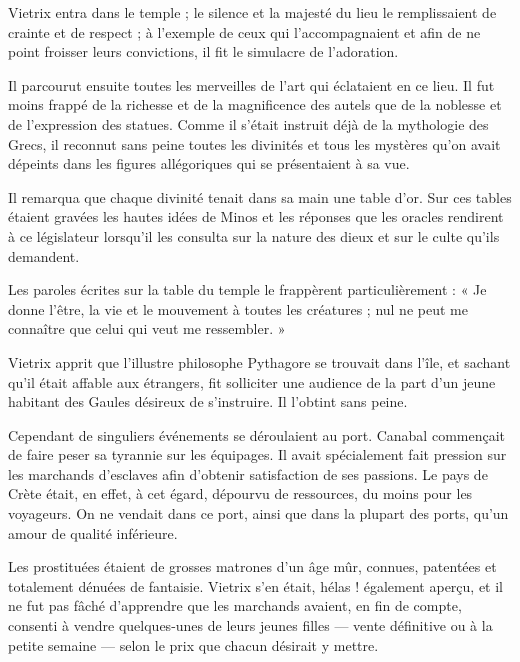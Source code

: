 \documentclass[a4paper, 11pt, oneside, polutonikogreek, french]{article}
\begin{document}
Vietrix entra dans le temple ; le silence et la majesté du lieu le remplissaient de crainte et de respect ; à l'exemple de ceux qui l'accompagnaient et afin de ne point froisser leurs convictions, il fit le simulacre de l'adoration.

Il parcourut ensuite toutes les merveilles de l'art qui éclataient en ce lieu. Il fut moins frappé de la richesse et de la magnificence des autels que de la noblesse et de l'expression des statues. Comme il s'était instruit déjà de la mythologie des Grecs, il reconnut sans peine toutes les divinités et tous les mystères qu'on avait dépeints dans les figures allégoriques qui se présentaient à sa vue.

Il remarqua que chaque divinité tenait dans sa main une table d'or. Sur ces tables étaient gravées les hautes idées de Minos et les réponses que les oracles rendirent à ce législateur lorsqu'il les consulta sur la nature des dieux et sur le culte qu'ils demandent.

Les paroles écrites sur la table du temple le frappèrent particulièrement : « Je donne l'être, la vie et le mouvement à toutes les créatures ; nul ne peut me connaître que celui qui veut me ressembler. »

\bigskip
\centerline{\EightStarTaper}
\centerline{\EightStarTaper\EightStarTaper}
\bigskip

Vietrix apprit que l'illustre philosophe Pythagore se trouvait dans l'île, et sachant qu'il était affable aux étrangers, fit solliciter une audience de la part d'un jeune habitant des Gaules désireux de s'instruire. Il l'obtint sans peine.

\bigskip
\centerline{\EightStarTaper}
\centerline{\EightStarTaper\EightStarTaper}
\bigskip

Cependant de singuliers événements se déroulaient au port. Canabal commençait de faire peser sa tyrannie sur les équipages. Il avait spécialement fait pression sur les marchands d'esclaves afin d'obtenir satisfaction de ses passions. Le pays de Crète était, en effet, à cet égard, dépourvu de ressources, du moins pour les voyageurs. On ne vendait dans ce port, ainsi que dans la plupart des ports, qu'un amour de qualité inférieure.

Les prostituées étaient de grosses matrones d'un âge mûr, connues, patentées et totalement dénuées de fantaisie. Vietrix s'en était, hélas ! également aperçu, et il ne fut pas fâché d'apprendre que les marchands avaient, en fin de compte, consenti à vendre quelques-unes de leurs jeunes filles --- vente définitive ou à la petite semaine --- selon le prix que chacun désirait y mettre.
\end{document}
